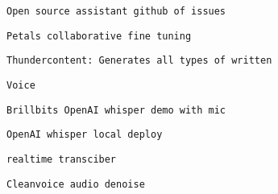          
         
          \protect\hypertarget{ID_1316122440}{}{}

\begin{verbatim}
Open source assistant github of issues
\end{verbatim}
         

         
         
          \protect\hypertarget{ID_813232383}{}{}

\begin{verbatim}
Petals collaborative fine tuning
\end{verbatim}
         

         
         
          \protect\hypertarget{ID_1121222993}{}{}

\begin{verbatim}
Thundercontent: Generates all types of written
\end{verbatim}
         
       

       
       
        \protect\hypertarget{ID_1018945850}{}{}

\begin{verbatim}
Voice
\end{verbatim}

         
         
          \protect\hypertarget{ID_1255728747}{}{}

\begin{verbatim}
Brillbits OpenAI whisper demo with mic
\end{verbatim}
         

         
         
          \protect\hypertarget{ID_1728234314}{}{}

\begin{verbatim}
OpenAI whisper local deploy
\end{verbatim}

           
           
            \protect\hypertarget{ID_1542886599}{}{}

\begin{verbatim}
realtime transciber
\end{verbatim}
           
         

         
         
          \protect\hypertarget{ID_849446585}{}{}

\begin{verbatim}
Cleanvoice audio denoise
\end{verbatim}
         

